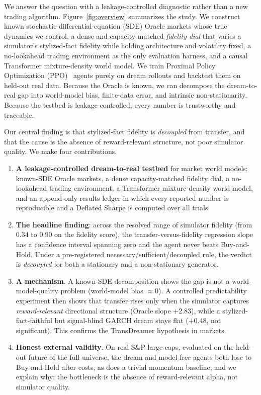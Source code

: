 \documentclass[conference]{IEEEtran}
\begin{document}
We answer the question with a leakage-controlled diagnostic rather than a new trading algorithm. Figure~\ref{fig:overview} summarizes the study. We construct known stochastic-differential-equation (SDE) Oracle markets whose true dynamics we control, a dense and capacity-matched \emph{fidelity dial} that varies a simulator's stylized-fact fidelity while holding architecture and volatility fixed, a no-lookahead trading environment as the only evaluation harness, and a causal Transformer mixture-density world model. We train Proximal Policy Optimization (PPO)~\cite{ppo} agents purely on dream rollouts and backtest them on held-out real data. Because the Oracle is known, we can decompose the dream-to-real gap into world-model bias, finite-data error, and intrinsic non-stationarity. Because the testbed is leakage-controlled, every number is trustworthy and traceable.

Our central finding is that stylized-fact fidelity is \emph{decoupled} from transfer, and that the cause is the absence of reward-relevant structure, not poor simulator quality. We make four contributions.

\begin{enumerate}
\item \textbf{A leakage-controlled dream-to-real testbed} for market world models: known-SDE Oracle markets, a dense capacity-matched fidelity dial, a no-lookahead trading environment, a Transformer mixture-density world model, and an append-only results ledger in which every reported number is reproducible and a Deflated Sharpe is computed over all trials.
\item \textbf{The headline finding}: across the resolved range of simulator fidelity (from $0.34$ to $0.90$ on the fidelity score), the transfer-versus-fidelity regression slope has a confidence interval spanning zero and the agent never beats Buy-and-Hold. Under a pre-registered necessary/sufficient/decoupled rule, the verdict is \emph{decoupled} for both a stationary and a non-stationary generator.
\item \textbf{A mechanism}. A known-SDE decomposition shows the gap is not a world-model-quality problem (world-model bias $\approx 0$). A controlled predictability experiment then shows that transfer rises only when the simulator captures \emph{reward-relevant} directional structure (Oracle slope $+2.83$), while a stylized-fact-faithful but signal-blind GARCH dream stays flat ($+0.48$, not significant). This confirms the TransDreamer hypothesis in markets.
\item \textbf{Honest external validity}. On real S\&P large-caps, evaluated on the held-out future of the full universe, the dream and model-free agents both lose to Buy-and-Hold after costs, as does a trivial momentum baseline, and we explain why: the bottleneck is the absence of reward-relevant alpha, not simulator quality.
\end{enumerate}
\end{document}
